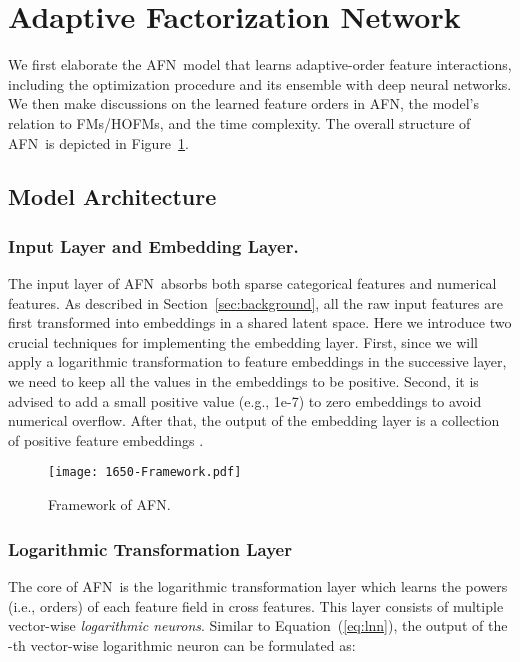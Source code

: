 \documentclass[letterpaper]{article} \usepackage{aaai20}  \usepackage{times}  \usepackage{helvet} \usepackage{courier}  \usepackage[hyphens]{url}  \usepackage{graphicx} \urlstyle{rm} \def\UrlFont{\rm}  \usepackage{graphicx}  \frenchspacing  \setlength{\pdfpagewidth}{8.5in}  \setlength{\pdfpageheight}{11in}
\newcommand{\model}{{AFN}~}
\newcommand{\modelns}{{AFN}}
\begin{document}
\section{Adaptive Factorization Network}
 
We first elaborate the \model model that learns adaptive-order feature interactions, including the optimization procedure and its ensemble with deep neural networks. We then make discussions on the learned feature orders in \modelns, the model's relation to FMs/HOFMs, and the time complexity. The overall structure of \model is depicted in Figure~\ref{fig:framework}.


\subsection{Model Architecture}
    
\subsubsection{Input Layer and Embedding Layer.}

The input layer of \model absorbs both sparse categorical features and numerical features. 
As described in Section~\ref{sec:background}, all the raw input features are first transformed into embeddings in a shared latent space. Here we introduce two crucial techniques for implementing the embedding layer. 
First, since we will apply a logarithmic transformation to feature embeddings in the successive layer, we need to keep all the values in the embeddings to be positive. Second, it is advised to add a small positive value  (e.g., 1e-7) to zero embeddings to avoid numerical overflow.
After that, the output of the embedding layer is a collection of positive feature embeddings .
 
 \begin{figure}[t]
\centering 
 	\texttt{[image: 1650-Framework.pdf]}
 	\caption{Framework of \modelns.}
 	\label{fig:framework}
 \end{figure}
 
\subsubsection{Logarithmic Transformation Layer}

The core of \model is the logarithmic transformation layer which learns the powers (i.e., orders) of each feature field in cross features.
This layer consists of multiple vector-wise \emph{logarithmic neurons}. Similar to Equation~(\ref{eq:lnn}), the output of the -th vector-wise logarithmic neuron can be formulated as:
\end{document}
